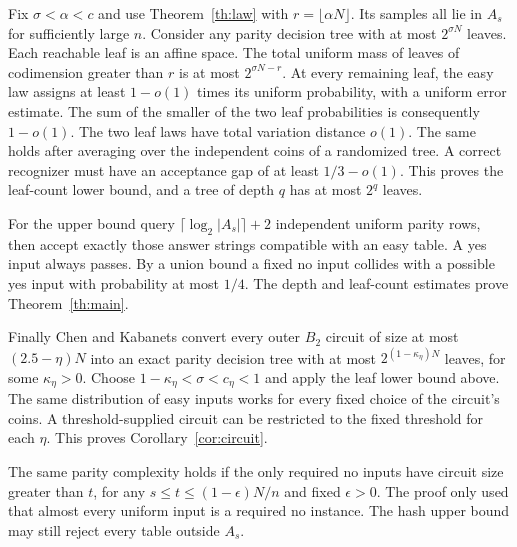\documentclass[11pt]{article}
\begin{document}
Fix $\sigma<\alpha<c$ and use Theorem~\ref{th:law} with $r=\lfloor\alpha N\rfloor$. Its samples all lie in $A_s$ for sufficiently large $n$. Consider any parity decision tree with at most $2^{\sigma N}$ leaves. Each reachable leaf is an affine space. The total uniform mass of leaves of codimension greater than $r$ is at most $2^{\sigma N-r}$. At every remaining leaf, the easy law assigns at least $1-o(1)$ times its uniform probability, with a uniform error estimate. The sum of the smaller of the two leaf probabilities is consequently $1-o(1)$. The two leaf laws have total variation distance $o(1)$. The same holds after averaging over the independent coins of a randomized tree. A correct recognizer must have an acceptance gap of at least $1/3-o(1)$. This proves the leaf-count lower bound, and a tree of depth $q$ has at most $2^q$ leaves.

For the upper bound query $\lceil\log_2|A_s|\rceil+2$ independent uniform parity rows, then accept exactly those answer strings compatible with an easy table. A yes input always passes. By a union bound a fixed no input collides with a possible yes input with probability at most $1/4$. The depth and leaf-count estimates prove Theorem~\ref{th:main}.

Finally Chen and Kabanets \cite[Lemma 4.6]{ck} convert every outer $B_2$ circuit of size at most $(2.5-\eta)N$ into an exact parity decision tree with at most $2^{(1-\kappa_\eta)N}$ leaves, for some $\kappa_\eta>0$. Choose $1-\kappa_\eta<\sigma<c_\eta<1$ and apply the leaf lower bound above. The same distribution of easy inputs works for every fixed choice of the circuit's coins. A threshold-supplied circuit can be restricted to the fixed threshold for each $\eta$. This proves Corollary~\ref{cor:circuit}.

The same parity complexity holds if the only required no inputs have circuit size greater than $t$, for any $s\le t\le(1-\epsilon)N/n$ and fixed $\epsilon>0$. The proof only used that almost every uniform input is a required no instance. The hash upper bound may still reject every table outside $A_s$.



\end{document}

